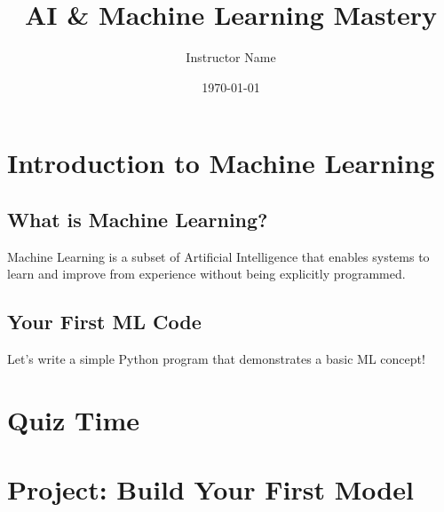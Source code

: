 \documentclass{article}
\title{AI & Machine Learning Mastery}
\author{Instructor Name}
\date{\today}
\newcommand{\learninguniverse}[1]{}
\newcommand{\lesson}[1]{}
\newcommand{\video}[1]{}
\newcommand{\practice}[1]{}
\newcommand{\quiz}[1]{}
\begin{document}
\maketitle

\learninguniverse{
title={AI & Machine Learning Mastery},
category={Artificial Intelligence},
difficulty={Intermediate}
}

\tableofcontents

\section{Introduction to Machine Learning}

\lesson{
title={Introduction to Machine Learning}
}

\subsection{What is Machine Learning?}
Machine Learning is a subset of Artificial Intelligence that enables systems to learn and improve from experience without being explicitly programmed.

\video{
type={youtube},
url={https://www.youtube.com/watch?v=HcqpanDadyQ}
}

\subsection{Your First ML Code}
Let's write a simple Python program that demonstrates a basic ML concept!

\practice{
language={python},
startercode={
import numpy as np

# Create a simple dataset
X = np.array([1, 2, 3, 4, 5])
y = np.array([2, 4, 6, 8, 10])

# Print the data
print("Features:", X)
print("Labels:", y)
},
expectedoutput={
Features: [1 2 3 4 5]
Labels: [ 2  4  6  8 10]
}
}

\section{Quiz Time}

\quiz{
question={What is Machine Learning?},
optionA={Programming Language},
optionB={System that learns from data},
optionC={Database},
optionD={Type of Hardware},
correct={B},
explanation={Machine Learning is a subset of AI that learns patterns from data without explicit programming.}
}

\section{Project: Build Your First Model}
\end{document}
